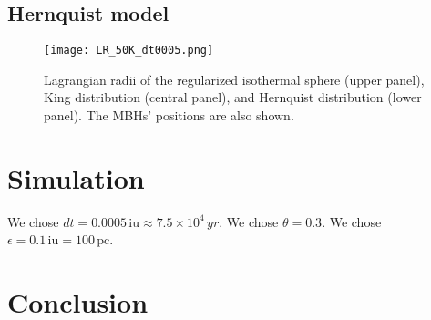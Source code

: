 \documentclass[fleqn,usenatbib]{mnras}
\begin{document}

\subsection{Hernquist model}\label{sec:Hernquist_model}
\begin{figure}\centering
	\texttt{[image: LR\_50K\_dt0005.png]}
    \caption{Lagrangian radii of the regularized isothermal sphere (upper panel), King distribution (central panel), and Hernquist distribution (lower panel). The MBHs' positions are also shown.}
    \label{fig:Lagrangian_radii}
\end{figure}


\section{Simulation}\label{sec:simulation}
We chose $dt = 0.0005 \,\text{iu} \approx 7.5 \times 10^4 \,yr$. We chose $\theta=0.3$. We chose $\epsilon=0.1 \,\text{iu} = 100 \,\text{pc}$.



\section{Conclusion}\label{sec:conclusion}



 


\label{lastpage}
\end{document}
